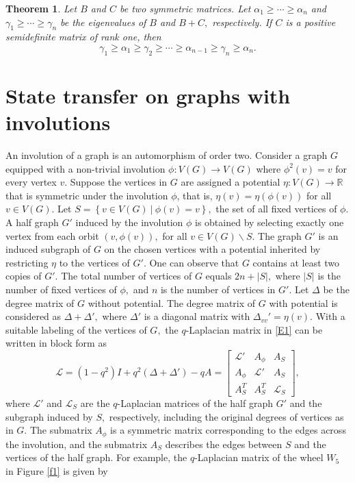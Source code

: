 \documentclass[12pt,a4paper]{article}
\newtheorem{thm}{Theorem}
\newcommand{\ob}[1]{\left(#1\right)}
\newcommand{\cb}[1]{\left\lbrace #1\right\rbrace}
\begin{document}
\begin{thm}\cite{so}\label{T1}
Let $B$ and $C$ be two symmetric matrices. Let $\alpha_1 \geq \cdots \geq \alpha_n$ and $\gamma_1  \geq \cdots \geq \gamma_n $ be the eigenvalues of $B$ and $B+C,$ respectively. If $C$ is a positive semidefinite matrix of rank one, then
$$\gamma_1 \geq \alpha_1 \geq \gamma_2 \geq \cdots\geq \alpha_{n-1} \geq \gamma_n \geq \alpha_n.$$
\end{thm} 


\section{State transfer on graphs with involutions}\label{sec2}
An involution of a graph is an automorphism of order two. Consider a graph $G$ equipped with a non-trivial involution $\phi: V(G) \to V(G)$ where $\phi^2(v)=v$ for every vertex $v.$ Suppose the vertices in $G$ are assigned a potential $\eta: V(G) \to \mathbb{R}$ that is symmetric under the involution $\phi$, that is, $\eta(v) = \eta(\phi(v))$ for all $v \in V(G).$ Let $S=\cb{v \in V(G) ~|~ \phi(v)=v},$ the set of all fixed vertices of $\phi.$ A half graph $G'$ induced by the involution $\phi$ is obtained by selecting exactly one vertex from each orbit $(v, \phi(v)),$ for all $v \in V(G)\backslash S.$ The graph $G'$ is an induced subgraph of $G$ on the chosen vertices with a potential inherited by restricting $\eta$ to the vertices of $G'$. One can observe that $G$ contains at least two copies of $G'$. The total number of vertices of $G$ equals $ 2n + |S|,$ where $|S|$ is the number of fixed vertices of $\phi,$ and $n$ is the number of vertices in $G'.$ Let $\Delta$ be the degree matrix of $G$ without potential. The degree matrix of $G$ with potential is considered as $\Delta+\Delta',$ where $\Delta '$ is a diagonal matrix with $\Delta_{vv}'=\eta(v).$ With a suitable labeling of the vertices of $G,$ the $q$-Laplacian matrix in \eqref{E1} can be written in block form as
\[\mathscr{L}= \ob{1-q^2}I+q^2(\Delta+\Delta')-qA=\begin{bmatrix}
	\mathscr{L}'& A_\phi& A_S\\
	A_\phi &\mathscr{L}' &A_S\\
	A_S^T & A_S^T & \mathscr{L}_S
\end{bmatrix},\]
where $\mathscr{L}'$ and $\mathscr{L}_S$ are the $q$-Laplacian matrices of the half graph $G'$ and the subgraph induced by $S,$ respectively, including the original degrees of vertices as in $G.$ The submatrix $A_\phi$ is a symmetric matrix corresponding to the edges across the involution, and the submatrix $A_S$ describes the edges between $S$ and the vertices of the half graph. For example, the $q$-Laplacian matrix of the wheel $W_5$ in Figure \ref{f1} is given by
\end{document}
